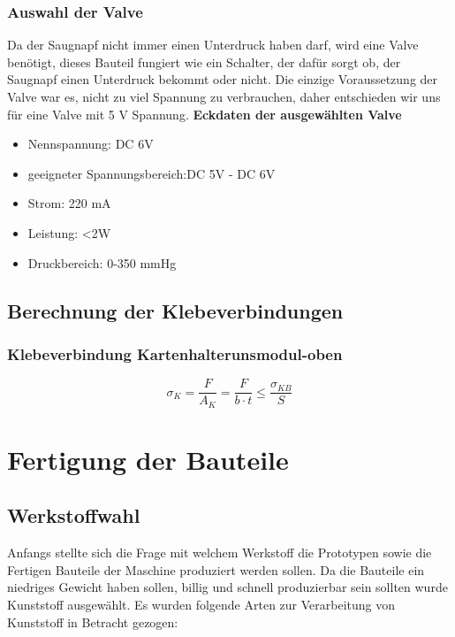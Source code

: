 \subsubsection{Auswahl der Valve}
Da der Saugnapf nicht immer einen Unterdruck haben darf, wird eine Valve benötigt, dieses Bauteil fungiert wie ein
Schalter, der dafür sorgt ob, der Saugnapf einen Unterdruck bekommt oder nicht. Die einzige Voraussetzung  der Valve war es, nicht zu viel Spannung zu verbrauchen, daher entschieden
wir uns für eine Valve mit 5 V Spannung.
\textbf{Eckdaten der ausgewählten Valve}
\begin{itemize}
    \item Nennspannung: DC 6V
    \item geeigneter Spannungsbereich:DC 5V - DC 6V
    \item Strom: 220 mA
    \item Leistung: <2W
    \item Druckbereich: 0-350 mmHg
\end{itemize}

\subsection{Berechnung der Klebeverbindungen}
\subsubsection{Klebeverbindung Kartenhalterunsmodul-oben}
\[\sigma _{K} = \frac{F}{A_{K}} = \frac{F}{b\cdot t}\leq \frac{\sigma _{KB}}{S}\]


\section{Fertigung der Bauteile}
\subsection{Werkstoffwahl}
Anfangs stellte sich die Frage mit welchem Werkstoff die Prototypen sowie die Fertigen Bauteile der
Maschine produziert werden sollen. Da die Bauteile ein niedriges Gewicht haben sollen, billig und schnell produzierbar
sein sollten wurde Kunststoff ausgewählt. Es wurden folgende Arten zur Verarbeitung von Kunststoff in Betracht gezogen:
